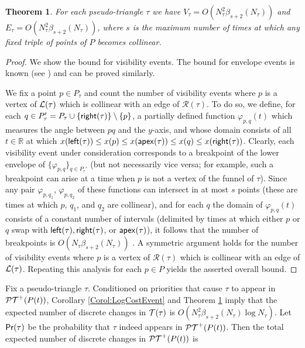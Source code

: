 \documentclass[11pt]{article}
\def\PT{{\cal PT}}
\def\T{{\cal T}}
\def\reals{{\mathbb R}}
\def\L{{\cal L}}
\def\R{\mathcal{R}}
\def\prob{{\sf Pr}}
\def\Left{{\sf left}}
\def\Right{{\sf right}}
\def\apex{{\sf apex}}
\newtheorem{theorem}{Theorem}[section]
\begin{document}
\begin{theorem}\label{Theorem:QuadEvents}
  For each pseudo-triangle $\tau $ we have
  $V_\tau=O(N_\tau^2\beta_{s+2}(N_\tau))$
and   $E_\tau=O(N_\tau^2\beta_{s+2}(N_\tau))$, where $s$ is the
  maximum number of times at which any fixed triple of points of $P$
  becomes collinear.
\end{theorem}
\begin{proof}
  We show the bound for visibility events. The bound for envelope
  events is known (see \cite{ABG,AKS}) and can be proved similarly.  

We fix a point $p\in
  P_\tau$ and count the number of visibility events where $p$ is a
  vertex of $\L(\tau)$ which is collinear with an edge of $\R(\tau)$.
  To do so, we define, for each $q\in P_\tau'=P_\tau\cup\{\Right(\tau)\}\setminus\{p\}$, a
  partially defined function $\varphi_{p,q}(t)$ which measures the
  angle between $pq$ and the $y$-axis, and whose domain consists of
  all $t\in \reals$ at which $x(\Left(\tau))\leq x(p)\leq
  x(\apex(\tau))\leq x(q)\leq x(\Right(\tau))$.  Clearly, each
  visibility event under consideration corresponds to a breakpoint of
  the lower envelope of $\{\varphi_{p,q}\}_{q\in P_\tau'}$ (but not necessarily vice versa; for example, such a breakpoint can arise at a time when $p$ is not a vertex of the funnel of $\tau$). Since any pair
  $\varphi_{p,q_1}$, $\varphi_{p,q_2}$ of these functions can intersect
  in at most $s$ points (these are times at which $p$, $q_1$, and $q_2$ are
  collinear),
and for each
$q$ the domain of  $\varphi_{p,q}(t)$ 
consists of a constant number of intervals (delimited by times at which either $p$ or $q$ swap with $\Left(\tau),\Right(\tau)$, or $\apex(\tau)$), it follows that the number of
  breakpoints is $O(N_\tau\beta_{s+2}(N_\tau))$ \cite{SA:ds}.  A
  symmetric argument holds for the number of visibility events where
  $p$ is a vertex of $\R(\tau)$ which is collinear with an edge of
  $\L(\tau)$. Repeating this analysis for each $p\in P$ yields the
  asserted overall bound.
\end{proof}



Fix a pseudo-triangle $\tau$. Conditioned on  priorities that
cause $\tau$ to appear in $\PT^+(P(t))$, Corollary \ref{Corol:LogCostEvent} and Theorem \ref{Theorem:QuadEvents} imply
that the expected number of discrete changes in $\T(\tau)$ is 
$O(N^2_\tau \beta_{s+2}(N_\tau) \log N_\tau)$. 
Let $\prob(\tau)$ be the probability that $\tau$ indeed
appears in $\PT^+(P(t))$. Then the total expected number of discrete 
changes in  $\PT^+(P(t))$
is
\end{document}
